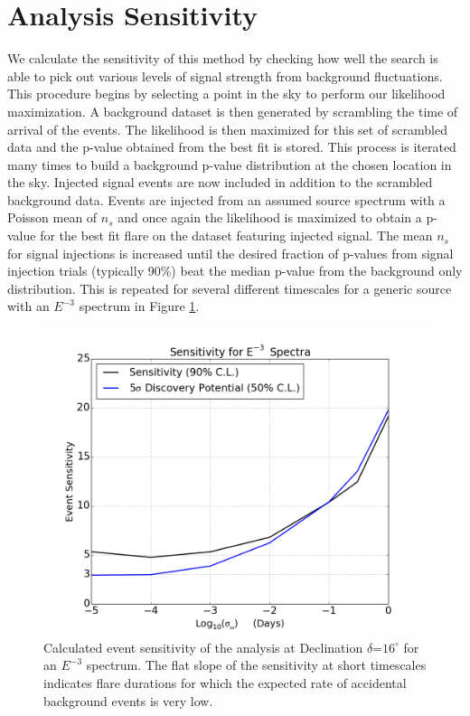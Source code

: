 \documentclass{gatech-thesis}
\begin{document}
\section{Analysis Sensitivity}

We calculate the sensitivity of this method by checking how well the search is able to pick out various levels of signal strength from background fluctuations. This procedure begins by selecting a point in the sky to perform our likelihood maximization. A background dataset is then generated by scrambling the time of arrival of the events. The likelihood is then maximized for this set of scrambled data and the p-value obtained from the best fit is stored. This process is iterated many times to build a background p-value distribution at the chosen location in the sky. Injected signal events are now included in addition to the scrambled background data. Events are injected from an assumed source spectrum with a Poisson mean of $n_s$ and once again the likelihood is maximized to obtain a p-value for the best fit flare on the dataset featuring injected signal. The mean $n_s$ for signal injections is increased until the desired fraction of p-values from signal injection trials (typically 90\%) beat the median p-value from the background only distribution. This is repeated for several different timescales for a generic source with an $E^{-3}$ spectrum in Figure \ref{fig:SensE3}.
\begin{figure}[ht]
  \begin{center}
    \includegraphics[width=.8\textwidth,keepaspectratio]{LowEnTransient_NEventDiscoveryPotentialANDSensitivity_E3.png}
  \end{center}
  \caption[Analysis Event Sensitivity]{Calculated event sensitivity of the analysis at Declination $\delta$=$16^{\circ}$ for an $E^{-3}$ spectrum. The flat slope of the sensitivity at short timescales indicates flare durations for which the expected rate of accidental background events is very low.}
  \label{fig:SensE3}
\end{figure}
\end{document}
